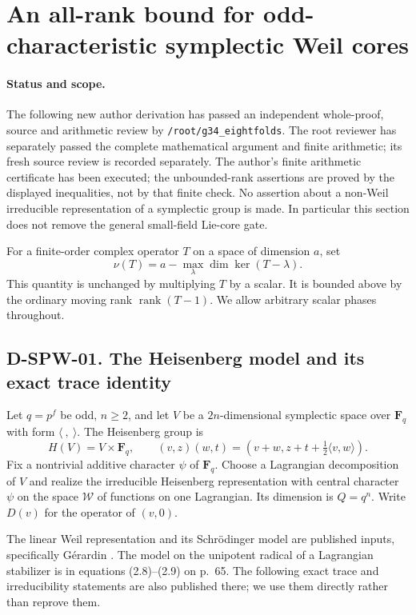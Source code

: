 \section{An all-rank bound for odd-characteristic symplectic Weil cores}
\label{sec:symplectic-weil-core}

\paragraph{Status and scope.}
The following new author derivation has passed an independent whole-proof,
source and arithmetic review by \texttt{/root/g34\_eightfolds}.
The root reviewer has separately passed the complete mathematical
argument and finite arithmetic; its fresh source review is recorded
separately.  The author's finite arithmetic certificate has been executed; the
unbounded-rank assertions are proved by the displayed inequalities,
not by that finite check.  No assertion about a non-Weil irreducible
representation of a symplectic group is made.  In particular this
section does not remove the general small-field Lie-core gate.

For a finite-order complex operator $T$ on a space of dimension $a$, set
\[
 \nu(T)=a-\max_{\lambda}\dim\ker(T-\lambda).
\]
This quantity is unchanged by multiplying $T$ by a scalar.  It is
bounded above by the ordinary moving rank $\operatorname{rank}(T-1)$.
We allow arbitrary scalar phases throughout.

\subsection*{D-SPW-01. The Heisenberg model and its exact trace identity}

Let $q=p^f$ be odd, $n\ge2$, and let $V$ be a $2n$-dimensional
symplectic space over $\mathbf F_q$ with form $\langle\ ,\ \rangle$.
The Heisenberg group is
\[
 H(V)=V\times\mathbf F_q,\qquad
 (v,z)(w,t)=(v+w,z+t+\tfrac12\langle v,w\rangle).
\]
Fix a nontrivial additive character $\psi$ of $\mathbf F_q$.
Choose a Lagrangian decomposition of $V$ and realize the irreducible
Heisenberg representation with central character $\psi$ on the
space $\mathcal W$ of functions on one Lagrangian.  Its dimension is
$Q=q^n$.  Write $D(v)$ for the operator of $(v,0)$.

The linear Weil representation and its Schr\"odinger model are
published inputs, specifically G\'erardin
\cite[Theorem~2.4(a), pp.~63--64, proof pp.~64--69]{SPW:Gerardin}.
The model on the unipotent radical of a Lagrangian stabilizer is
in equations (2.8)--(2.9) on p.~65.  The following exact trace
and irreducibility statements are also published there; we use
them directly rather than reprove them.

